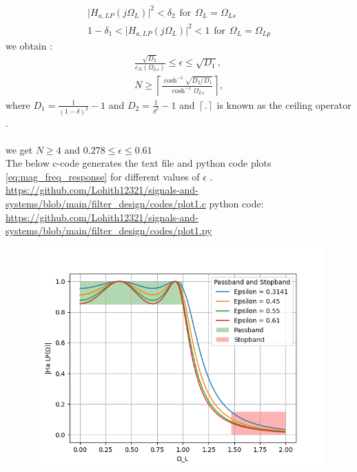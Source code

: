 \documentclass{article}
\begin{document}
\begin{itemize}
\begin{align}
    \vert H_{a,LP}(j\Omega_L)\vert^2 < \delta_{2} \hspace{5pt} \text{for}\hspace{5pt} \Omega_L = \Omega_{Ls}\\
    1-\delta_{1}<\vert H_{a,LP}(j\Omega_L)\vert^2 < 1 \hspace{5pt} \text{for}\hspace{5pt} \Omega_L = \Omega_{Lp}
\end{align}
we obtain :
\begin{eqnarray}
\label{lpdesign}
\frac{\sqrt{D_2}}{c_N(\Omega_{Ls})} \leq \epsilon \leq \sqrt{D_1}, \nonumber \\
N \geq \left\lceil \frac{\cosh^{-1}\sqrt{D_2/D_1}}{\cosh^{-1}\Omega_{Ls}} \right\rceil,
\end{eqnarray}
where $D_1 = \frac{1}{(1 - \delta)^2}-1$ and $D_2 = \frac{1}{\delta^2} - 1$ and $\left \lceil . \right \rceil$ is known as the ceiling operator . \\
\\

we get $N\geq 4$ and $0.278 \leq \epsilon \leq 0.61$\\
The below c-code generates the text file and python code plots \eqref{eq:mag_freq_response} for different values of $\epsilon$ .\\
\href{https://github.com/Lohith12321/signals-and-systems/blob/main/filter_design/codes/plot1.c}
{https://github.com/Lohith12321/signals-and-systems/blob/main/filter_design/codes/plot1.c}
python code:\\
\href{https://github.com/Lohith12321/signals-and-systems/blob/main/filter_design/codes/plot1.py}{https://github.com/Lohith12321/signals-and-systems/blob/main/filter_design/codes/plot1.py}
\begin{figure}[H]
\centering
\includegraphics[width=1\columnwidth]{figs/plot1.png}

\end{figure}
\end{itemize}
\end{document}
